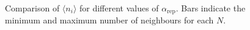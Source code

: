 \begin{figure}[p]
    \caption{Comparison of $\langle n_i \rangle$ for different values of $\alpha_\text{rep}$. Bars indicate the minimum and maximum number of neighbours for each $N$.}
    \label{fig:reps_ni_vs}
\end{figure}